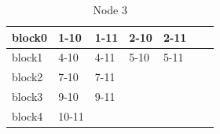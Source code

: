 \documentclass[a4paper]{article}
\begin{document}
\begin{table}[]
\centering
\caption{Node 3}
\label{my-label}
\begin{tabular}{l|llllll}
block0 & 1-10  & 1-11 & 2-10 & 2-11 &  &  \\ \hline
block1 & 4-10  & 4-11 & 5-10 & 5-11 &  &  \\ \hline
block2 & 7-10  & 7-11 &      &      &  &  \\ \hline
block3 & 9-10  & 9-11 &      &      &  &  \\ \hline
block4 & 10-11 &      &      &      &  & 
\end{tabular}
\end{table}

\printbibliography 
\end{document}
